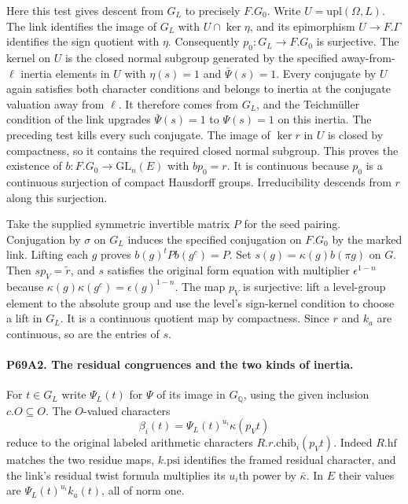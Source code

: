 Here this test gives descent from $G_L$ to precisely $F.G_0$.
Write $U=\mathrm{upl}(\Omega,L)$. The link identifies the image
of $G_L$ with $U\cap\ker\eta$, and its epimorphism
$U\to F.\Gamma$ identifies the sign quotient with $\eta$.
Consequently $p_0:G_L\to F.G_0$ is surjective. The kernel on
$U$ is the closed normal subgroup generated by the specified
away-from-$\ell$ inertia elements in $U$ with $\eta(s)=1$ and
$\bar\Psi(s)=1$. Every conjugate by $U$ again satisfies both
character conditions and belongs to inertia at the conjugate
valuation away from $\ell$. It therefore comes from $G_L$,
and the Teichm\"uller condition of the link upgrades
$\bar\Psi(s)=1$ to $\Psi(s)=1$ on this inertia. The preceding
test kills every such conjugate. The image of $\ker r$ in $U$
is closed by compactness, so it contains the required closed
normal subgroup. This proves the existence of $b:F.G_0\to
\mathrm{GL}_n(E)$ with $b p_0=r$. It is continuous because
$p_0$ is a continuous surjection of compact Hausdorff groups.
Irreducibility descends from $r$ along this surjection.

Take the supplied symmetric invertible matrix $P$ for the seed
pairing. Conjugation by $\sigma$ on $G_L$ induces the specified
conjugation on $F.G_0$ by the marked link. Lifting each $g$ proves
$b(g)^tP b(g^c)=P$. Set
$s(g)=\kappa(g)b(\pi g)$ on $G$. Then $s p_V=\widetilde r$,
and $s$ satisfies the original form equation with multiplier
$\epsilon^{1-n}$ because
$\kappa(g)\kappa(g^c)=\epsilon(g)^{1-n}$.
The map $p_V$ is surjective: lift a level-group element to the
absolute group and use the level's sign-kernel condition to
choose a lift in $G_L$. It is a continuous quotient map by
compactness. Since $r$ and $k_a$ are continuous, so are the
entries of $s$.

\paragraph{P69A2. The residual congruences and the two kinds of inertia.}
For $t\in G_L$ write $\Psi_L(t)$ for $\Psi$ of its image in
$G_{\mathbb Q}$, using the given inclusion $c.O\subseteq O$.
The $O$-valued characters
\[
             \beta_i(t)=\Psi_L(t)^{u_i}\kappa(p_Vt)
\]
reduce to the original labeled arithmetic characters
$R.r.\mathrm{chib}_i(p_Vt)$. Indeed $R.\mathrm{hf}$ matches the
two residue maps, $k.\mathrm{psi}$ identifies the framed residual
character, and the link's residual twist formula multiplies
its $u_i$th power by $\bar\kappa$. In $E$ their values are
$\Psi_L(t)^{u_i} k_a(t)$, all of norm one.

